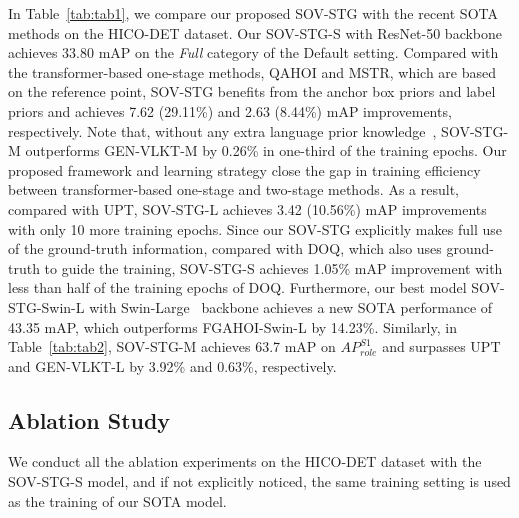 \documentclass[10pt,twocolumn,letterpaper]{article}
\begin{document}
In Table~\ref{tab:tab1}, we compare our proposed SOV-STG with the recent SOTA methods on the HICO-DET dataset.
Our SOV-STG-S with ResNet-50 backbone achieves 33.80 mAP on the \textit{Full} category of the Default setting.
Compared with the transformer-based one-stage methods, QAHOI and MSTR, which are based on the reference point,
SOV-STG benefits from the anchor box priors and label priors and achieves 7.62 (29.11\%) and 2.63 (8.44\%) mAP improvements, respectively.
Note that, without any extra language prior knowledge~\cite{radford2021learning}, SOV-STG-M outperforms GEN-VLKT-M by 0.26\% in one-third of the training epochs.
Our proposed framework and learning strategy close the gap in training efficiency between transformer-based one-stage and two-stage methods.
As a result, compared with UPT, SOV-STG-L achieves 3.42 (10.56\%) mAP improvements with only 10 more training epochs.
Since our SOV-STG explicitly makes full use of the ground-truth information, compared with DOQ, which also uses ground-truth to guide the training, SOV-STG-S achieves 1.05\% mAP improvement with less than half of the training epochs of DOQ.
Furthermore, our best model SOV-STG-Swin-L with Swin-Large~\cite{liu2021swin} backbone achieves a new SOTA performance of 43.35 mAP, which outperforms FGAHOI-Swin-L by 14.23\%.
Similarly, in Table~\ref{tab:tab2}, SOV-STG-M achieves 63.7 mAP on $AP_{role}^{S1}$ and surpasses UPT and GEN-VLKT-L by 3.92\% and 0.63\%, respectively.

\subsection{Ablation Study}

We conduct all the ablation experiments on the HICO-DET dataset with the SOV-STG-S model, and if not explicitly noticed, the same training setting is used as the training of our SOTA model.
\end{document}
